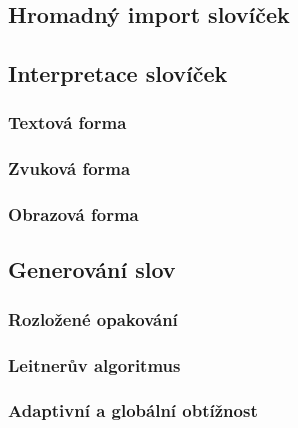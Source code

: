 \documentclass[a4paper,11pt,titlepage,fleqn]{article}
\begin{document}
        \subsection{Hromadný import slovíček}

    \subsection{Interpretace slovíček}

        \subsubsection{Textová forma}

        \subsubsection{Zvuková forma}

        \subsubsection{Obrazová forma}

    \subsection{Generování slov}

        \subsubsection{Rozložené opakování} %

        \subsubsection{Leitnerův algoritmus}

        \subsubsection{Adaptivní a globální obtížnost}
\end{document}
